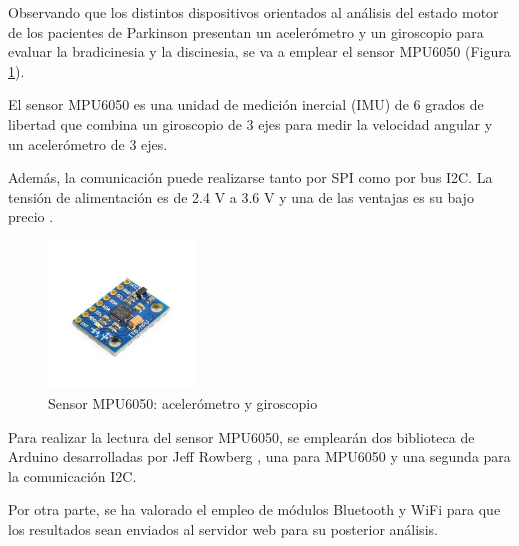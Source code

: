 Observando que los distintos dispositivos orientados al análisis del estado motor de los pacientes de Parkinson presentan un acelerómetro y un giroscopio para evaluar la bradicinesia y la discinesia, se va a emplear el sensor MPU6050 (Figura \ref{fig:MPU6050}). 

El sensor MPU6050 es una unidad de medición inercial (IMU) de 6 grados de libertad que combina un giroscopio de 3 ejes para medir la velocidad angular y un acelerómetro de 3 ejes. 

Además, la comunicación puede realizarse tanto por SPI como por bus I2C. La tensión de alimentación es de 2.4 V a 3.6 V y una de las ventajas es su bajo precio \cite{website:luisllamas-mpu, website:naylampmechatronics}. 

\begin{figure}[ht]
        \centering
        \includegraphics[width=0.35\textwidth]{img/modulo6050.jpg}
        \caption{Sensor MPU6050: acelerómetro y giroscopio  \cite{website:naylampmechatronics} }
        \label{fig:MPU6050}
\end{figure}

Para realizar la lectura del sensor MPU6050, se emplearán dos biblioteca de Arduino desarrolladas por Jeff Rowberg \cite{website:github.com/jrowberg}, una para MPU6050 y una segunda para la comunicación I2C.

Por otra parte, se ha valorado el empleo de módulos Bluetooth y WiFi para que los resultados sean enviados al servidor web para su posterior análisis.

